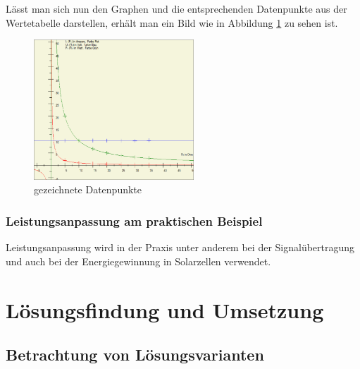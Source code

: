 \documentclass[a4paper]{article}
\begin{document}
    Lässt man sich nun den Graphen und die entsprechenden Datenpunkte aus der Wertetabelle darstellen, erhält man ein Bild wie in Abbildung \ref{fig:graphbefuellt} zu sehen ist.
    \begin{figure}[!h]
        \begin{center}
            \includegraphics[width=6cm]{img/graphbefuellt}
            \caption{gezeichnete Datenpunkte}
            \label{fig:graphbefuellt}
        \end{center}
    \end{figure}

    \subsubsection{Leistungsanpassung am praktischen Beispiel}
    
    Leistungsanpassung wird in der Praxis unter anderem bei der Signalübertragung und auch bei der Energiegewinnung in Solarzellen verwendet.

\newpage
\section{Lösungsfindung und Umsetzung}

\subsection{Betrachtung von Lösungsvarianten}
\end{document}
